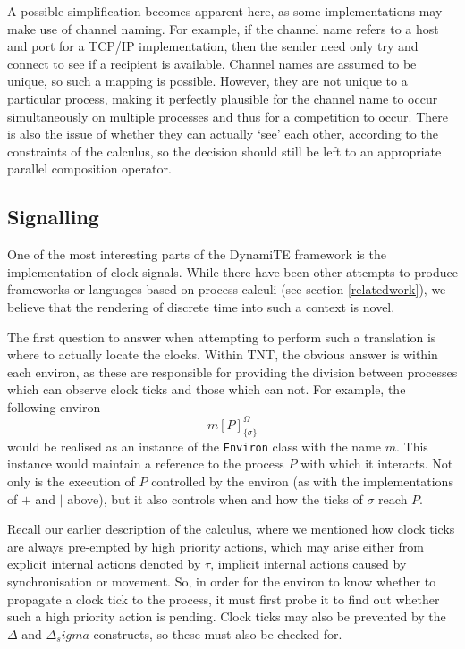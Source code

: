 \documentclass{sig-alternate}
\newcommand{\loc}[4]{{#1}[ #2 ]^{#3}_{\{#4\}}}
\begin{document}
A possible simplification becomes apparent here, as some implementations
may make use of channel naming.  For example, if the channel name refers
to a host and port for a TCP/IP implementation, then the sender need
only try and connect to see if a recipient is available.  Channel names
are assumed to be unique, so such a mapping is possible.  However, they
are not unique to a particular process, making it perfectly plausible
for the channel name to occur simultaneously on multiple processes and
thus for a competition to occur.  There is also the issue of whether
they can actually `see' each other, according to the constraints of the
calculus, so the decision should still be left to an appropriate
parallel composition operator.

\subsection{Signalling}
\label{signalling}

One of the most interesting parts of the DynamiTE framework is the
implementation of clock signals.  While there have been other attempts
to produce frameworks or languages based on process calculi (see section
\ref{relatedwork}), we believe that the rendering of discrete time into
such a context is novel.

The first question to answer when attempting to perform such a
translation is where to actually locate the clocks.  Within TNT, the
obvious answer is within each environ, as these are responsible for
providing the division between processes which can observe clock ticks
and those which can not.  For example, the following environ
\begin{displaymath}
\loc{m}{P}{\Omega}{\sigma}
\end{displaymath}
would be realised as an instance of the \texttt{Environ} class with the
name $m$.  This instance would maintain a reference to the process $P$
with which it interacts.  Not only is the execution of $P$ controlled by
the environ (as with the implementations of $+$ and $\mid$ above), but
it also controls when and how the ticks of $\sigma$ reach $P$.

Recall our earlier description of the calculus, where we mentioned how
clock ticks are always pre-empted by high priority actions, which may
arise either from explicit internal actions denoted by $\tau$, implicit
internal actions caused by synchronisation or movement.  So, in order
for the environ to know whether to propagate a clock tick to the
process, it must first probe it to find out whether such a high priority
action is pending.  Clock ticks may also be prevented by the $\Delta$
and $\Delta_sigma$ constructs, so these must also be checked for.
\end{document}
